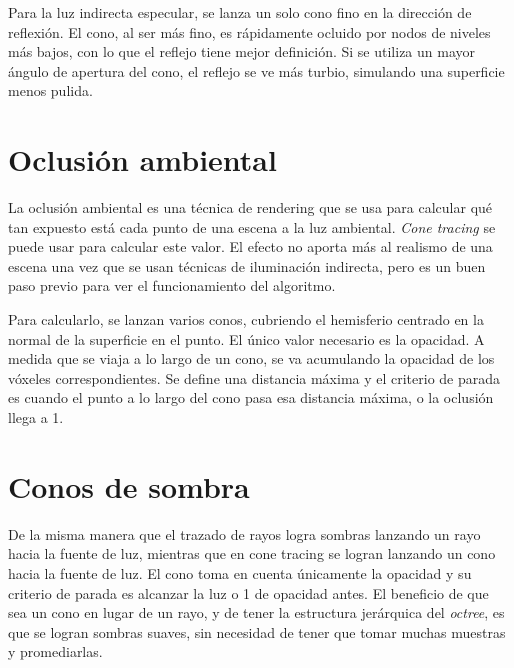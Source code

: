 Para la luz indirecta especular, se lanza un solo cono fino en la dirección de reflexión.
El cono, al ser más fino, es rápidamente ocluido por nodos de niveles más bajos, con lo que el reflejo tiene mejor definición.
Si se utiliza un mayor ángulo de apertura del cono, el reflejo se ve más turbio, simulando una superficie menos pulida.

\section{Oclusión ambiental}

La oclusión ambiental es una técnica de rendering que se usa para calcular qué tan expuesto está cada punto de una escena a la luz ambiental.
\textit{Cone tracing} se puede usar para calcular este valor.
El efecto no aporta más al realismo de una escena una vez que se usan técnicas de iluminación indirecta, pero es un buen paso previo para ver el funcionamiento del algoritmo.

Para calcularlo, se lanzan varios conos, cubriendo el hemisferio centrado en la normal de la superficie en el punto.
El único valor necesario es la opacidad.
A medida que se viaja a lo largo de un cono, se va acumulando la opacidad de los vóxeles correspondientes.
Se define una distancia máxima y el criterio de parada es cuando el punto a lo largo del cono pasa esa distancia máxima, o la oclusión llega a 1.

\section{Conos de sombra}

De la misma manera que el trazado de rayos logra sombras lanzando un rayo hacia la fuente de luz, mientras que en cone tracing se logran lanzando un cono hacia la fuente de luz.
El cono toma en cuenta únicamente la opacidad y su criterio de parada es alcanzar la luz o 1 de opacidad antes.
El beneficio de que sea un cono en lugar de un rayo, y de tener la estructura jerárquica del \textit{octree}, es que se logran sombras suaves, sin necesidad de tener que tomar muchas muestras y promediarlas.

